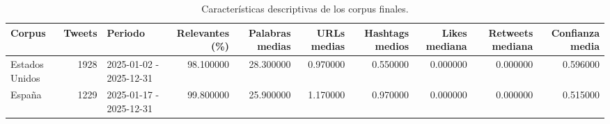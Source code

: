 \begin{table}
\caption{Características descriptivas de los corpus finales.}
\label{tab:caracteristicas_corpus}
\begin{tabular}{lrlrrrrrrr}
\toprule
Corpus & Tweets & Periodo & Relevantes (\%) & Palabras medias & URLs medias & Hashtags medios & Likes mediana & Retweets mediana & Confianza media \\
\midrule
Estados Unidos & 1928 & 2025-01-02 - 2025-12-31 & 98.100000 & 28.300000 & 0.970000 & 0.550000 & 0.000000 & 0.000000 & 0.596000 \\
España & 1229 & 2025-01-17 - 2025-12-31 & 99.800000 & 25.900000 & 1.170000 & 0.970000 & 0.000000 & 0.000000 & 0.515000 \\
\bottomrule
\end{tabular}
\end{table}
